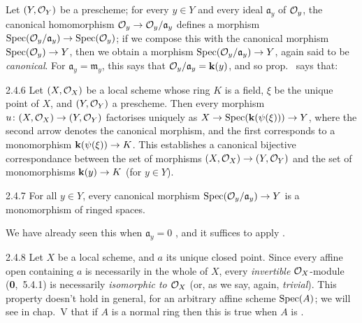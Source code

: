 Let $(Y,\mathcal{O}_Y)$ be a prescheme; for every $y\in Y$ and every ideal
$\mathfrak{a}_y$ of $\mathcal{O}_y$, the canonical homomorphism
$\mathcal{O}_y\to\mathcal{O}_y/\mathfrak{a}_y$ defines a morphism
$\operatorname{Spec}(\mathcal{O}_y/\mathfrak{a}_y)\to\operatorname{Spec}(\mathcal{O}_y)$; if we compose this with the
canonical morphism $\operatorname{Spec}(\mathcal{O}_y)\to Y$, then we obtain a morphism
$\operatorname{Spec}(\mathcal{O}_y/\mathfrak{a}_y)\to Y$, again said to be \textit{canonical}. For
$\mathfrak{a}_y=\mathfrak{m}_y$, this says that $\mathcal{O}_y/\mathfrak{a}_y=\mathbf{k}(y)$, and
so prop.~ says that:
    
\begin{env}[Corollary]{2.4.6}
\label{cor-1.2.4.6}
Let $(X,\mathcal{O}_X)$ be a local scheme
whose ring $K$ is a field, $\xi$ be the unique point of $X$, and $(Y,\mathcal{O}_Y)$ a
prescheme. Then every morphism $u\colon(X,\mathcal{O}_X)\to(Y,\mathcal{O}_Y)$ factorises uniquely
as $X\to\operatorname{Spec}(\mathbf{k}(\psi(\xi)))\to Y$, where the second arrow denotes the canonical
morphism, and the first corresponds to a monomorphism $\mathbf{k}(\psi(\xi))\to K$.
This establishes a canonical bijective correspondance between the set of
morphisms $(X,\mathcal{O}_X)\to (Y,\mathcal{O}_Y)$ and the set of monomorphisms $\mathbf{k}(y)\to K$ (for
$y\in Y$).
\end{env}
    
\begin{env}[Corollary]{2.4.7}
\label{cor-1.2.4.7}
For all $y\in Y$, every canonical morphism
$\operatorname{Spec}(\mathcal{O}_y/\mathfrak{a}_y)\to Y$ is a monomorphism of ringed spaces.
\end{env}
    
We have already seen this when $\mathfrak{a}_y=0$ , and it suffices
to apply .
    
\begin{envr}[Remark]{2.4.8}
\label{rmk-1.2.4.8}
Let $X$ be a local scheme, and $a$ its unique
closed point.  Since every affine open containing $a$ is necessarily in the
whole of $X$, every \emph{invertible} $\mathcal{O}_X$-module (\textbf{0},~5.4.1) is
necessarily \emph{isomorphic to $\mathcal{O}_X$} (or, as we say, again, \emph{trivial}).
This property doesn't hold in general, for an arbitrary affine scheme
$\operatorname{Spec}(A)$; we will see in chap.~V that if $A$ is a normal ring then this is
true when $A$ is .
\end{envr}

